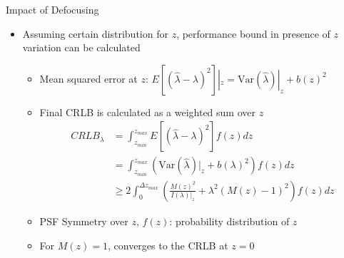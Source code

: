 \documentclass[t]{beamer}
\begin{document}
\begin{frame}{
    Impact of Defocusing 
}
    \begin{itemize}
        \item Assuming certain distribution for $z$, performance bound in presence of $z$ variation can be calculated  
    \begin{itemize}
        \item Mean squared error at $z$: $E[(\hat{\lambda}-\lambda)^2]|_z = \textrm{Var}(\hat{\lambda})|_{z} + b(z)^2 $
        \item Final CRLB is calculated as a weighted sum over $z$
\begin{align*}
    CRLB_{\lambda} &= \int_{z_{min}}^{z_{max}} E[(\hat{\lambda}-\lambda)^2] f(z)dz \\
                   &= \int_{z_{min}}^{z_{max}}{\left(\textrm{Var}(\hat{\lambda})|_{z}+b(\lambda)^2\right)f(z)dz}\\
                   &\geq 2\int_{0}^{\Delta z_{max}}{\left(\frac{M(z)^2}{I(\lambda)|_z}+\lambda^2 (M(z)-1)^2\right)f(z)dz}
\end{align*}
    \item PSF Symmetry over $z$, $f(z)$: probability distribution of $z$
        \item For $M(z)=1$, converges to the CRLB at $z=0$
    \end{itemize}
    \end{itemize}
\end{frame}
\end{document}
